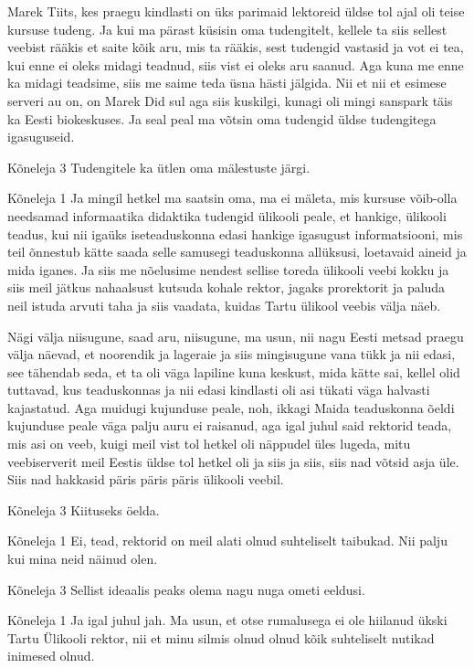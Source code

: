 Marek Tiits, kes praegu kindlasti on üks parimaid lektoreid üldse tol ajal oli teise kursuse tudeng. Ja kui ma pärast küsisin oma tudengitelt, kellele ta siis sellest veebist rääkis et saite kõik aru, mis ta rääkis, sest tudengid vastasid ja vot ei tea, kui enne ei oleks midagi teadnud, siis vist ei oleks aru saanud. Aga kuna me enne ka midagi teadsime, siis me saime teda üsna hästi jälgida. Nii et nii et esimese serveri au on, on Marek Did sul aga siis kuskilgi, kunagi oli mingi sanspark täis ka Eesti biokeskuses. Ja seal peal ma võtsin oma tudengid üldse tudengitega igasuguseid. 

Kõneleja 3
Tudengitele ka ütlen oma mälestuste järgi. 

Kõneleja 1
Ja mingil hetkel ma saatsin oma, ma ei mäleta, mis kursuse võib-olla needsamad informaatika didaktika tudengid ülikooli peale, et hankige, ülikooli teadus, kui nii igaüks iseteaduskonna edasi hankige igasugust informatsiooni, mis teil õnnestub kätte saada selle samusegi teaduskonna allüksusi, loetavaid aineid ja mida iganes. Ja siis me nõelusime nendest sellise toreda ülikooli veebi kokku ja siis meil jätkus nahaalsust kutsuda kohale rektor, jagaks prorektorit ja paluda neil istuda arvuti taha ja siis vaadata, kuidas Tartu ülikool veebis välja näeb. 

Nägi välja niisugune, saad aru, niisugune, ma usun, nii nagu Eesti metsad praegu välja näevad, et noorendik ja lageraie ja siis mingisugune vana tükk ja nii edasi, see tähendab seda, et ta oli väga lapiline kuna keskust, mida kätte sai, kellel olid tuttavad, kus teaduskonnas ja nii edasi kindlasti oli asi tükati väga halvasti kajastatud. Aga muidugi kujunduse peale, noh, ikkagi Maida teaduskonna õeldi kujunduse peale väga palju auru ei raisanud, aga igal juhul said rektorid teada, mis asi on veeb, kuigi meil vist tol hetkel oli näppudel üles lugeda, mitu veebiserverit meil Eestis üldse tol hetkel oli ja siis ja siis, siis nad võtsid asja üle. Siis nad hakkasid päris päris päris ülikooli veebil. 

Kõneleja 3
Kiituseks öelda. 

Kõneleja 1
Ei, tead, rektorid on meil alati olnud suhteliselt taibukad. Nii palju kui mina neid näinud olen. 

Kõneleja 3
Sellist ideaalis peaks olema nagu nuga ometi eeldusi. 

Kõneleja 1
Ja igal juhul jah. Ma usun, et otse rumalusega ei ole hiilanud ükski Tartu Ülikooli rektor, nii et minu silmis olnud olnud kõik suhteliselt nutikad inimesed olnud. 

